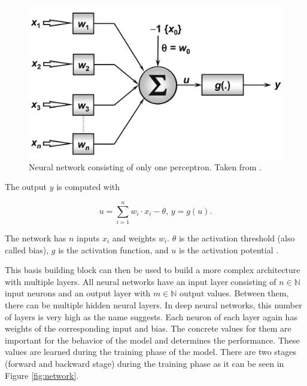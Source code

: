 \begin{figure}[htbp!]
	\centering
	\includegraphics[scale=0.18]{figures/perceptron.png}
	\caption{ Neural network consisting of only one perceptron. Taken from \cite{da2017artificial}. }
	\label{fig:perceptron}
\end{figure}

The output $ y $ is computed with 

\begin{equation}
	u = \sum_{i=1}^n w_i \cdot x_i - \theta  \text{,   } y = g(u).
\end{equation}

The network has $ n $ inputs $ x_i $ and weights $ w_i $. $ \theta $ is the activation threshold (also called bias), $ g $ is the activation function, and $ u $ is the activation potential \cite{da2017artificial}. 

This basis building block can then be used to build a more complex architecture with multiple layers. All neural networks have an input layer consisting of $ n \in \mathbb{N}$ input neurons and an output layer with $ m \in \mathbb{N} $ output values. Between them, there can be multiple hidden neural layers. In deep neural networks, this number of layers is very high as the name suggests. Each neuron of each layer again has weights of the corresponding input and bias. The concrete values for them are important for the behavior of the model and determines the performance. These values are learned during the training phase of the model. There are two stages (forward and backward stage) during the training phase as it can be seen in Figure \ref{fig:network}.

